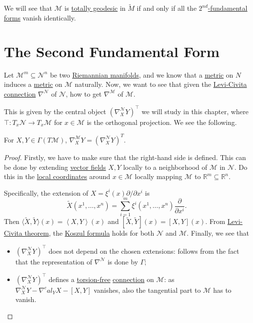\begin{note}
	We will see that \(\mathcal{M} \) is \hyperref[def:totally-geodesic]{totally geodesic} in \(\widetilde{M} \) if and only if all the \hyperref[def:2nd-fundamental-form]{\(2^{nd}\)-fundamental forms} vanish identically.
\end{note}

\section{The Second Fundamental Form}
Let \(\mathcal{M} ^m \subseteq \mathcal{N} ^n\) be two \hyperref[def:Riemannian-manifold]{Riemannian manifolds}, and we know that a \hyperref[def:Riemannian-metric]{metric} on \(N\) induces a \hyperref[def:Riemannian-metric]{metric} on \(\mathcal{M} \) naturally. Now, we want to see that given the \hyperref[def:Levi-Civita-connection]{Levi-Civita connection} \(\nabla ^\mathcal{N} \) of \(\mathcal{N} \), how to get \(\nabla ^\mathcal{M} \) of \(\mathcal{M} \).

This is given by the central object \((\nabla ^\mathcal{N} _X Y)^{\top}\) we will study in this chapter, where \(\top \colon T_x \mathcal{N} \to T_x \mathcal{M} \) for \(x\in \mathcal{M} \) is the orthogonal projection. We see the following.

\begin{theorem}\label{thm:lec14}
	For \(X, Y\in \Gamma (T \mathcal{M} )\), \(\nabla ^\mathcal{M} _X Y = \left( \nabla ^\mathcal{N} _X Y \right)^{T}\).
\end{theorem}
\begin{proof}
	Firstly, we have to make sure that the right-hand side is defined. This can be done by extending \hyperref[def:vector-field]{vector fields} \(X, Y\) locally to a neighborhood of \(\mathcal{M} \) in \(\mathcal{N} \). Do this in the \hyperref[def:local-coordinate]{local coordinates} around \(x\in \mathcal{M} \) locally mapping \(\mathcal{M} \) to \(\mathbb{R} ^m \subseteq \mathbb{R} ^n\).

	Specifically, the extension of \(X = \xi ^i(x) \partial / \partial x^i\) is
	\[
		\widetilde{X} (x^1, \ldots , x^n) = \sum_{i=1}^{m} \xi ^i(x^1, \ldots , x^n) \frac{\partial }{\partial x^i}.
	\]
	Then \(\langle \widetilde{X} , \widetilde{Y} \rangle (x) = \left\langle X, Y \right\rangle (x)\) and \([\widetilde{X} , \widetilde{Y} ](x) = [X, Y](x)\). From \hyperref[thm:Levi-Civita]{Levi-Civita theorem}, the \hyperref[eq:Koszul-formula]{Koszul formula} holds for both \(\mathcal{N} \) and \(\mathcal{M} \). Finally, we see that
	\begin{itemize}
		\item \((\nabla _X^{\mathcal{N}} Y)^{\top}\) does not depend on the chosen extensions: follows from the fact that the representation of \(\nabla ^\mathcal{N} \) is done by \(\Gamma \);
		\item \((\nabla _X^{\mathcal{N}} Y)^{\top}\) defines a \hyperref[def:torsion-free]{torsion-free} \hyperref[def:linear-connection]{connection} on \(\mathcal{M} \): as \(\nabla ^\mathcal{N} _X Y - \nabla ^cal_Y X - [X, Y]\) vanishes, also the tangential part to \(\mathcal{M} \) has to vanish.
	\end{itemize}
\end{proof}

